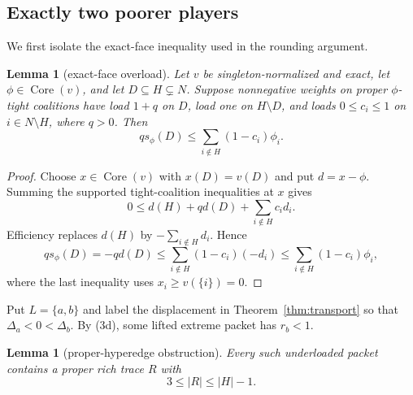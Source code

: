 \documentclass[11pt]{article}
\newtheorem{lemma}[theorem]{Lemma}
\newcommand{\core}{\operatorname{Core}}
\begin{document}
\subsection{Exactly two poorer players}

We first isolate the exact-face inequality used in the rounding argument.

\begin{lemma}[exact-face overload]\label{lem:overload}
Let $v$ be singleton-normalized and exact, let $\phi\in\core(v)$, and
let $D\subseteq H\subsetneq N$. Suppose nonnegative weights on proper
$\phi$-tight coalitions have load $1+q$ on $D$, load one on $H\setminus D$,
and loads $0\le c_i\le1$ on $i\in N\setminus H$, where $q>0$. Then
\[
 q s_\phi(D)\le\sum_{i\notin H}(1-c_i)\phi_i.       \tag{7}
\]
\end{lemma}

\begin{proof}
Choose $x\in\core(v)$ with $x(D)=v(D)$ and put $d=x-\phi$.
Summing the supported tight-coalition inequalities at $x$ gives
\[
 0\le d(H)+q d(D)+\sum_{i\notin H}c_i d_i.
\]
Efficiency replaces $d(H)$ by $-\sum_{i\notin H}d_i$. Hence
\[
 q s_\phi(D)=-q d(D)
 \le\sum_{i\notin H}(1-c_i)(-d_i)
 \le\sum_{i\notin H}(1-c_i)\phi_i,
\]
where the last inequality uses $x_i\ge v(\{i\})=0$.
\end{proof}

Put $L=\{a,b\}$ and label the displacement in
Theorem~\ref{thm:transport} so that $\Delta_a<0<\Delta_b$.  By (3d), some
lifted extreme packet has $r_b<1$.

\begin{lemma}[proper-hyperedge obstruction]\label{lem:rankthree}
Every such underloaded packet contains a proper rich trace $R$ with
\[
 3\le |R|\le |H|-1.                                  \tag{8}
\]
\end{lemma}
\end{document}
